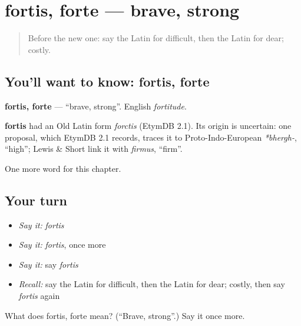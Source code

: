 \section[fortis, forte]{fortis, forte — brave, strong}

\label{lesson:LA-C97-fortis}



\begin{quote}
Before the new one: say the Latin for difficult, then the Latin for dear; costly.
\end{quote}

\subsection*{You'll want to know: fortis, forte}
\textbf{fortis, forte} — \textquotedblleft{}brave, strong\textquotedblright{}. English \emph{fortitude}.

\begin{cousinweb}
\textbf{fortis} had an Old Latin form \emph{forctis} (EtymDB 2.1). Its origin is uncertain: one proposal, which EtymDB 2.1 records, traces it to Proto-Indo-European \emph{*bhergh-}, \textquotedblleft{}high\textquotedblright{}; Lewis \& Short link it with \emph{firmus}, \textquotedblleft{}firm\textquotedblright{}.
\end{cousinweb}

\begin{grammarlens}[title={What you've built}]
One more word for this chapter.
\end{grammarlens}

\subsection*{Your turn}
\begin{itemize}
\raggedright
  \item \emph{Say it:} \emph{fortis}
  \item \emph{Say it:} \emph{fortis}, once more
  \item \emph{Say it:} say \emph{fortis}
  \item \emph{Recall:} say the Latin for difficult, then the Latin for dear; costly, then say \emph{fortis} again
\end{itemize}

\begin{tcolorbox}[breakable,colback=teal!4,colframe=teal!35!black,title={Before you move on}]
What does fortis, forte mean? (\textquotedblleft{}Brave, strong\textquotedblright{}.) Say it once more.
\end{tcolorbox}
